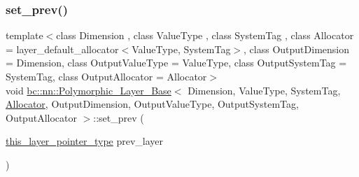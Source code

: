 \mbox{\label{structbc_1_1nn_1_1Polymorphic__Layer__Base_a4555d0376d65ee631208b5aa6f67d7f2}} 
\subsubsection{\texorpdfstring{set\+\_\+prev()}{set\_prev()}\hspace{0.1cm}{\footnotesize\ttfamily [1/2]}}
{\footnotesize\ttfamily template$<$class Dimension , class Value\+Type , class System\+Tag , class Allocator  = layer\+\_\+default\+\_\+allocator$<$\+Value\+Type, System\+Tag$>$, class Output\+Dimension  = Dimension, class Output\+Value\+Type  = Value\+Type, class Output\+System\+Tag  = System\+Tag, class Output\+Allocator  = Allocator$>$ \\
void \hyperlink{structbc_1_1nn_1_1Polymorphic__Layer__Base}{bc\+::nn\+::\+Polymorphic\+\_\+\+Layer\+\_\+\+Base}$<$ Dimension, Value\+Type, System\+Tag, \hyperlink{classbc_1_1allocators_1_1Allocator}{Allocator}, Output\+Dimension, Output\+Value\+Type, Output\+System\+Tag, Output\+Allocator $>$\+::set\+\_\+prev (\begin{DoxyParamCaption}\item[{\hyperlink{structbc_1_1nn_1_1Polymorphic__Layer__Base_a6240b9012fcc8ed91d8a41f07d7c4bd9}{this\+\_\+layer\+\_\+pointer\+\_\+type}}]{prev\+\_\+layer }\end{DoxyParamCaption})\hspace{0.3cm}{\ttfamily [inline]}}

\mbox{\label{structbc_1_1nn_1_1Polymorphic__Layer__Base_a4555d0376d65ee631208b5aa6f67d7f2}} 
